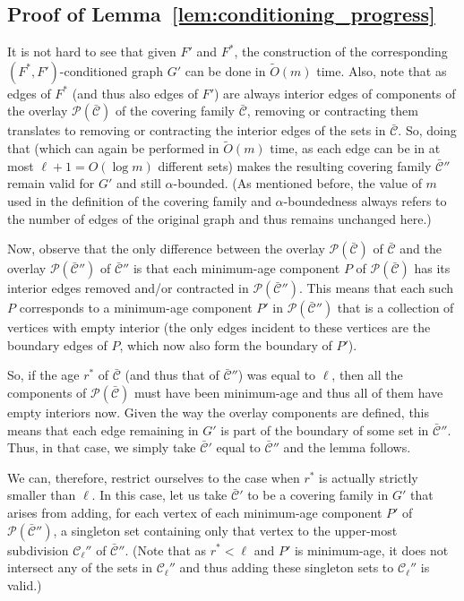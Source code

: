 \documentclass[11pt, letterpaper]{article}
\newcommand{\cC}{\mathcal{C}}
\newcommand{\ocC}{\bar{\mathcal{C}}}
\newcommand{\cP}{\mathcal{P}}
\newcommand{\tO}{\widetilde{O}}
\begin{document}
\subsection{Proof of Lemma~\ref{lem:conditioning_progress}} \label{app:conditioning_progress}

It is not hard to see that given $F'$ and $F^*$, the construction of the corresponding $(F^*,F')$-conditioned graph $G'$ can be done in $\tO(m)$ time. Also, note that as edges of $F^*$ (and thus also edges of $F'$) are always interior edges of components of the overlay $\cP(\ocC)$ of the covering family $\ocC$, removing or contracting them translates to removing or contracting the interior edges of the sets in $\ocC$. So, doing that (which can again be performed in $\tO(m)$ time, as each edge can be in at most $\ell+1=O(\log m)$ different sets) makes the resulting covering family $\ocC''$ remain valid for $G'$ and still $\alpha$-bounded. (As mentioned before, the value of $m$ used in the definition of the covering family and $\alpha$-boundedness always refers to the number of edges of the original graph and thus remains unchanged here.)

Now, observe that the only difference between the overlay $\cP(\ocC)$ of $\ocC$ and the overlay $\cP(\ocC'')$ of $\ocC''$ is that each minimum-age component $P$ of $\cP(\ocC)$ has its interior edges removed and/or contracted in $\cP(\ocC'')$. This means that each such $P$ corresponds to a minimum-age component $P'$ in $\cP(\ocC'')$ that is a collection of vertices with empty interior (the only edges incident to these vertices are the boundary edges of $P$, which now also form the boundary of $P'$). 

So, if the age $r^*$ of $\ocC$ (and thus that of $\ocC''$) was equal to $\ell$, then all the components of $\cP(\ocC)$ must have been minimum-age and thus all of them have empty interiors now. Given the way the overlay components are defined, this means that each edge remaining in $G'$ is part of the boundary of some set in $\ocC''$. Thus, in that case, we simply take $\ocC'$ equal to $\ocC''$ and the lemma follows. 

We can, therefore, restrict ourselves to the case when $r^*$ is actually strictly smaller than $\ell$. In this case, let us take $\ocC'$ to be a covering family in $G'$ that arises from adding, for each vertex of each minimum-age component $P'$ of $\cP(\ocC'')$, a singleton set containing only that vertex to the upper-most subdivision $\cC_{\ell}''$ of $\ocC''$. (Note that as $r^*<\ell$ and $P'$ is minimum-age, it does not intersect any of the sets in $\cC_{\ell}''$ and thus adding these singleton sets to $\cC_{\ell}''$ is valid.)
\end{document}
